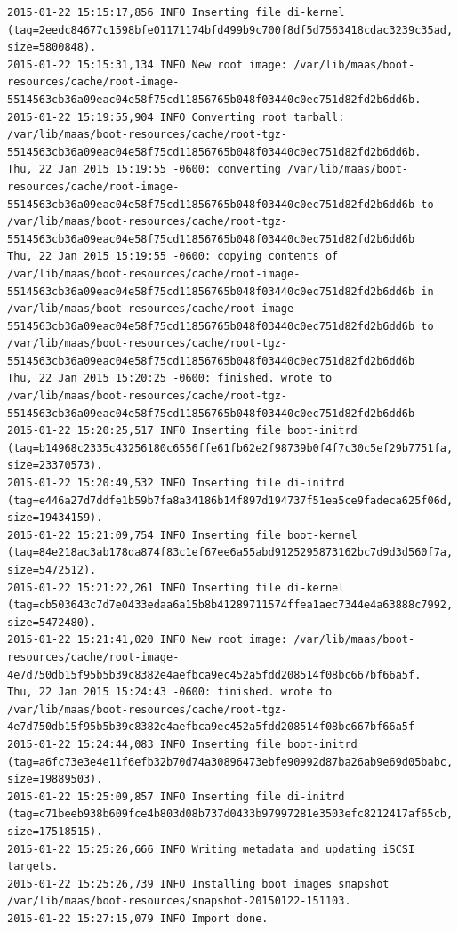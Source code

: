 {\begin{verbatim}
2015-01-22 15:15:17,856 INFO Inserting file di-kernel (tag=2eedc84677c1598bfe01171174bfd499b9c700f8df5d7563418cdac3239c35ad, size=5800848).
2015-01-22 15:15:31,134 INFO New root image: /var/lib/maas/boot-resources/cache/root-image-5514563cb36a09eac04e58f75cd11856765b048f03440c0ec751d82fd2b6dd6b.
2015-01-22 15:19:55,904 INFO Converting root tarball: /var/lib/maas/boot-resources/cache/root-tgz-5514563cb36a09eac04e58f75cd11856765b048f03440c0ec751d82fd2b6dd6b.
Thu, 22 Jan 2015 15:19:55 -0600: converting /var/lib/maas/boot-resources/cache/root-image-5514563cb36a09eac04e58f75cd11856765b048f03440c0ec751d82fd2b6dd6b to /var/lib/maas/boot-resources/cache/root-tgz-5514563cb36a09eac04e58f75cd11856765b048f03440c0ec751d82fd2b6dd6b
Thu, 22 Jan 2015 15:19:55 -0600: copying contents of /var/lib/maas/boot-resources/cache/root-image-5514563cb36a09eac04e58f75cd11856765b048f03440c0ec751d82fd2b6dd6b in /var/lib/maas/boot-resources/cache/root-image-5514563cb36a09eac04e58f75cd11856765b048f03440c0ec751d82fd2b6dd6b to /var/lib/maas/boot-resources/cache/root-tgz-5514563cb36a09eac04e58f75cd11856765b048f03440c0ec751d82fd2b6dd6b
Thu, 22 Jan 2015 15:20:25 -0600: finished. wrote to /var/lib/maas/boot-resources/cache/root-tgz-5514563cb36a09eac04e58f75cd11856765b048f03440c0ec751d82fd2b6dd6b
2015-01-22 15:20:25,517 INFO Inserting file boot-initrd (tag=b14968c2335c43256180c6556ffe61fb62e2f98739b0f4f7c30c5ef29b7751fa, size=23370573).
2015-01-22 15:20:49,532 INFO Inserting file di-initrd (tag=e446a27d7ddfe1b59b7fa8a34186b14f897d194737f51ea5ce9fadeca625f06d, size=19434159).
2015-01-22 15:21:09,754 INFO Inserting file boot-kernel (tag=84e218ac3ab178da874f83c1ef67ee6a55abd9125295873162bc7d9d3d560f7a, size=5472512).
2015-01-22 15:21:22,261 INFO Inserting file di-kernel (tag=cb503643c7d7e0433edaa6a15b8b41289711574ffea1aec7344e4a63888c7992, size=5472480).
2015-01-22 15:21:41,020 INFO New root image: /var/lib/maas/boot-resources/cache/root-image-4e7d750db15f95b5b39c8382e4aefbca9ec452a5fdd208514f08bc667bf66a5f.
Thu, 22 Jan 2015 15:24:43 -0600: finished. wrote to /var/lib/maas/boot-resources/cache/root-tgz-4e7d750db15f95b5b39c8382e4aefbca9ec452a5fdd208514f08bc667bf66a5f
2015-01-22 15:24:44,083 INFO Inserting file boot-initrd (tag=a6fc73e3e4e11f6efb32b70d74a30896473ebfe90992d87ba26ab9e69d05babc, size=19889503).
2015-01-22 15:25:09,857 INFO Inserting file di-initrd (tag=c71beeb938b609fce4b803d08b737d0433b97997281e3503efc8212417af65cb, size=17518515).
2015-01-22 15:25:26,666 INFO Writing metadata and updating iSCSI targets.
2015-01-22 15:25:26,739 INFO Installing boot images snapshot /var/lib/maas/boot-resources/snapshot-20150122-151103.
2015-01-22 15:27:15,079 INFO Import done.

\end{verbatim}
}


